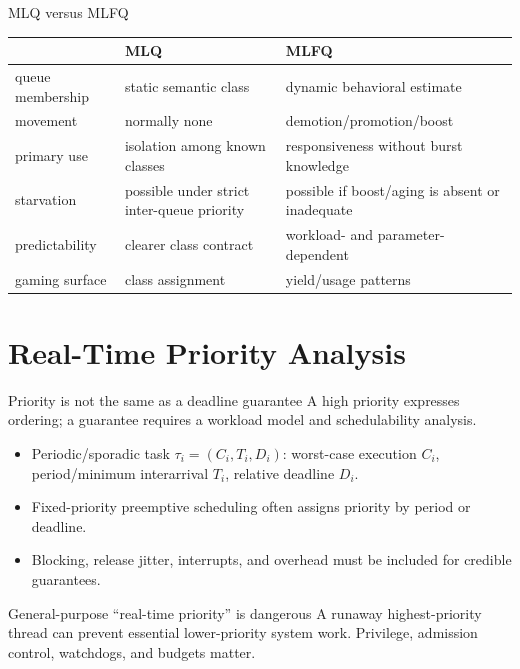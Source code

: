 \documentclass[aspectratio=169,11pt]{beamer}
\begin{document}
\begin{frame}{MLQ versus MLFQ}
  \small
  \begin{tabularx}{\textwidth}{@{}lXX@{}}
    \toprule
    & \textbf{MLQ} & \textbf{MLFQ} \\
    \midrule
    queue membership & static semantic class & dynamic behavioral estimate \\
    movement & normally none & demotion/promotion/boost \\
    primary use & isolation among known classes & responsiveness without burst knowledge \\
    starvation & possible under strict inter-queue priority & possible if boost/aging is absent or inadequate \\
    predictability & clearer class contract & workload- and parameter-dependent \\
    gaming surface & class assignment & yield/usage patterns \\
    \bottomrule
  \end{tabularx}
\end{frame}

\section{Real-Time Priority Analysis}

\begin{frame}{Priority is not the same as a deadline guarantee}
  A high priority expresses ordering; a guarantee requires a workload model and schedulability analysis.
  \begin{itemize}
    \item Periodic/sporadic task $\tau_i=(C_i,T_i,D_i)$: worst-case execution $C_i$, period/minimum interarrival $T_i$, relative deadline $D_i$.
    \item Fixed-priority preemptive scheduling often assigns priority by period or deadline.
    \item Blocking, release jitter, interrupts, and overhead must be included for credible guarantees.
  \end{itemize}
  \begin{alertblock}{General-purpose ``real-time priority'' is dangerous}
    A runaway highest-priority thread can prevent essential lower-priority system work. Privilege, admission control, watchdogs, and budgets matter.
  \end{alertblock}
\end{frame}
\end{document}
